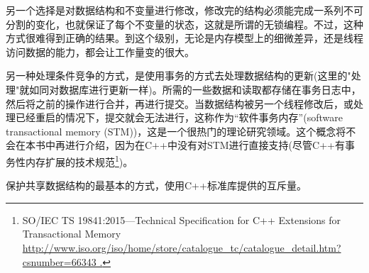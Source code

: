 另一个选择是对数据结构和不变量进行修改，修改完的结构必须能完成一系列不可分割的变化，也就保证了每个不变量的状态，这就是所谓的无锁编程。不过，这种方式很难得到正确的结果。到这个级别，无论是内存模型上的细微差异，还是线程访问数据的能力，都会让工作量变的很大。

另一种处理条件竞争的方式，是使用事务的方式去处理数据结构的更新(这里的"处理"就如同对数据库进行更新一样)。所需的一些数据和读取都存储在事务日志中，然后将之前的操作进行合并，再进行提交。当数据结构被另一个线程修改后，或处理已经重启的情况下，提交就会无法进行，这称作为“软件事务内存”(software transactional memory (STM))，这是一个很热门的理论研究领域。这个概念将不会在本书中再进行介绍，因为在C++中没有对STM进行直接支持(尽管C++有事务性内存扩展的技术规范\footnote[1]{SO/IEC TS 19841:2015—Technical Specification for C++ Extensions for Transactional Memory \url{http://www.iso.org/iso/home/store/catalogue_tc/catalogue_detail.htm?csnumber=66343 .}})。

保护共享数据结构的最基本的方式，使用C++标准库提供的互斥量。



